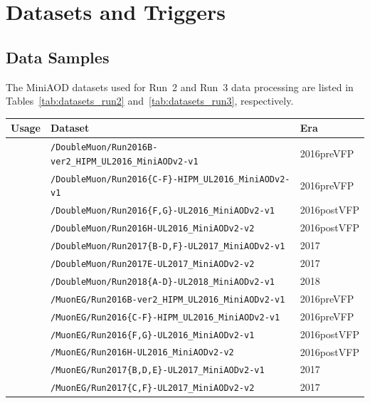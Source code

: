 \chapter{Datasets and Triggers}
\label{app:triggers}

\section*{Data Samples}

The MiniAOD datasets used for Run~2 and Run~3 data processing are listed in Tables~\ref{tab:datasets_run2} and~\ref{tab:datasets_run3}, respectively.

\begin{table}
  \centering
  \footnotesize
  \begin{tabular}{lll}
  \hline\hline
  \textbf{Usage} & \textbf{Dataset} & \textbf{Era} \\
  \hline
  & \texttt{/DoubleMuon/Run2016B-ver2\_HIPM\_UL2016\_MiniAODv2-v1} & 2016preVFP \\
  & \texttt{/DoubleMuon/Run2016\{C-F\}-HIPM\_UL2016\_MiniAODv2-v1} & 2016preVFP \\
  & \texttt{/DoubleMuon/Run2016\{F,G\}-UL2016\_MiniAODv2-v1} & 2016postVFP \\
  & \texttt{/DoubleMuon/Run2016H-UL2016\_MiniAODv2-v2} & 2016postVFP \\
  & \texttt{/DoubleMuon/Run2017\{B-D,F\}-UL2017\_MiniAODv2-v1} & 2017 \\
  & \texttt{/DoubleMuon/Run2017E-UL2017\_MiniAODv2-v2} & 2017 \\
  & \texttt{/DoubleMuon/Run2018\{A-D\}-UL2018\_MiniAODv2-v1} & 2018 \\
  \hline
  & \texttt{/MuonEG/Run2016B-ver2\_HIPM\_UL2016\_MiniAODv2-v1} & 2016preVFP \\
  & \texttt{/MuonEG/Run2016\{C-F\}-HIPM\_UL2016\_MiniAODv2-v1} & 2016preVFP \\
  & \texttt{/MuonEG/Run2016\{F,G\}-UL2016\_MiniAODv2-v1} & 2016postVFP \\
  & \texttt{/MuonEG/Run2016H-UL2016\_MiniAODv2-v2} & 2016postVFP \\
  & \texttt{/MuonEG/Run2017\{B,D,E\}-UL2017\_MiniAODv2-v1} & 2017 \\
  & \texttt{/MuonEG/Run2017\{C,F\}-UL2017\_MiniAODv2-v2} & 2017 \\

\end{tabular}
\end{table}
